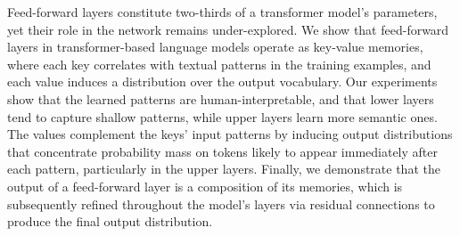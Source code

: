Feed-forward layers constitute two-thirds of a transformer model's parameters, yet their role in the network remains under-explored. We show that feed-forward layers in transformer-based language models operate as key-value memories, where each key correlates with textual patterns in the training examples, and each value induces a distribution over the output vocabulary. Our experiments show that the learned patterns are human-interpretable, and that lower layers tend to capture shallow patterns, while upper layers learn more semantic ones. The values complement the keys' input patterns by inducing output distributions that concentrate probability mass on tokens likely to appear immediately after each pattern, particularly in the upper layers. Finally, we demonstrate that the output of a feed-forward layer is a composition of its memories, which is subsequently refined throughout the model's layers via residual connections to produce the final output distribution.
